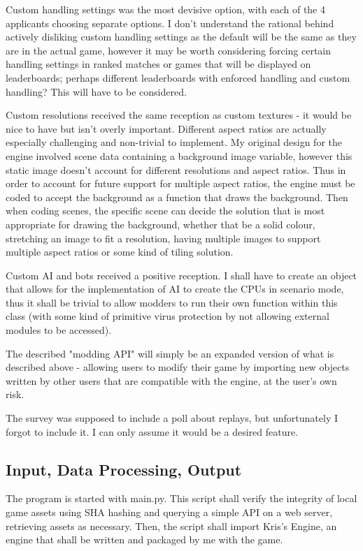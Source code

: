 \documentclass{article}
\begin{document}
Custom handling settings was the most devisive option, with each of the 4 applicants choosing separate options. I don't understand the rational behind actively disliking custom handling settings as the default will be the same as they are in the actual game, however it may be worth considering forcing certain handling settings in ranked matches or games that will be displayed on leaderboards; perhaps different leaderboards with enforced handling and custom handling? This will have to be considered.

Custom resolutions received the same reception as custom textures - it would be nice to have but isn't overly important. Different aspect ratios are actually especially challenging and non-trivial to implement. My original design for the engine involved scene data containing a background image variable, however this static image doesn't account for different resolutions and aspect ratios. Thus in order to account for future support for multiple aspect ratios, the engine must be coded to accept the background as a function that draws the background. Then when coding scenes, the specific scene can decide the solution that is most appropriate for drawing the background, whether that be a solid colour, stretching an image to fit a resolution, having multiple images to support multiple aspect ratios or some kind of tiling solution.

Custom AI and bots received a positive reception. I shall have to create an object that allows for the implementation of AI to create the CPUs in scenario mode, thus it shall be trivial to allow modders to run their own function within this class (with some kind of primitive virus protection by not allowing external modules to be accessed).

The described "modding API" will simply be an expanded version of what is described above - allowing users to modify their game by importing new objects written by other users that are compatible with the engine, at the user's own risk.

The survey was supposed to include a poll about replays, but unfortunately I forgot to include it. I can only assume it would be a desired feature.

\subsection{Input, Data Processing, Output}

The program is started with main.py. This script shall verify the integrity of local game assets using SHA hashing and querying a simple API on a web server, retrieving assets as necessary. Then, the script shall import Kris's Engine, an engine that shall be written and packaged by me with the game. 
\end{document}
